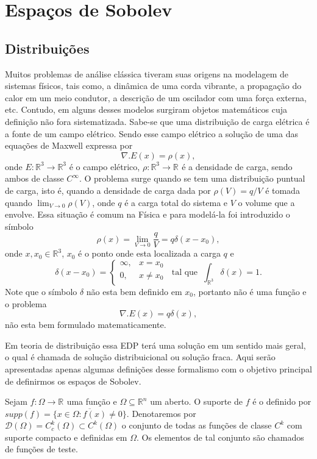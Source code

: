\documentclass[12pt]{book}
\newcommand{\funcaocond}[5]{
	#1 = 
	\left\{
	\begin{array}{cc}
		#2, & #3\\
		#4, & #5\\
	\end{array}
	\right.
}
\newcommand{\funcoesdiferenciaveis}[2]{C^{#1}(#2)}
\newcommand{\funcoesdiferenciaveissupp}[2]{C^{#1}_{c}(#2)}
\newcommand{\funcoesteste}{\mathcal{D}(\Omega)}
\newcommand{\real}[1]{\mathbb{R}^{#1}}
\newcommand{\reta}{\real{}}
\begin{document}
	
	\chapter{Espaços de Sobolev}
	\section{Distribuições}\label{secao_distribuicoes}
	Muitos problemas de análise clássica tiveram suas origens na modelagem de sistemas físicos, tais como, a dinâmica de uma corda vibrante, a propagação do calor em um meio condutor, a descrição de um oscilador com uma força externa, etc. Contudo, em alguns desses modelos surgiram objetos matemáticos cuja definição não fora sistematizada. Sabe-se que uma distribuição de carga elétrica é a fonte de um campo elétrico. Sendo esse campo elétrico a solução de uma das equações de Maxwell expressa por
	$$
	\nabla.E(x) = \rho(x),
	$$
	onde $E:\real{3} \to \real{3}$ é o campo elétrico, $\rho:\real{3}\to \reta$ é a densidade de carga, sendo ambos de classe $C^{\infty}$. O problema surge quando se tem uma distribuição puntual de carga, isto é, quando a densidade de carga dada por $\rho(V) = q/V$ é tomada quando $\lim_{V \to 0}\rho(V)$, onde $q$ é a carga total do sistema e $V$ o volume que a envolve. Essa situação é comum na Física e para modelá-la foi introduzido o símbolo
	$$
	\rho(x) = \lim_{V\to 0} \frac{q}{V} = q\delta(x - x_{0}),
	$$
	onde $x,x_{0} \in \real{3}$, $x_{0}$ é o ponto onde esta localizada a carga $q$ e 
	$$
	\funcaocond{\delta(x - x_{0})}{\infty}{x=x_{0}}{0}{x\neq x_{0}}\;\; \text{tal que} \;\; \int_{\real{3}} \delta(x) = 1.
	$$
	Note que o símbolo $\delta$ não esta bem definido em $x_{0}$, portanto não é uma função e o problema 
	$$
	\nabla.E(x) = q\delta(x),
	$$
	não esta bem formulado matematicamente. 
	
	Em teoria de distribuição essa EDP terá uma solução em um sentido mais geral, o qual é chamada de solução distribuicional ou solução fraca. Aqui serão apresentadas apenas algumas definições desse formalismo com o objetivo principal de definirmos os espaços de Sobolev.
	
	Sejam $f:\Omega\to \reta$ uma função e $\Omega \subseteq \real{n}$ um aberto. O suporte de $f$ é o definido por $supp(f) = \overline{\{ x\in \Omega: f(x)\neq 0 \}}$. Denotaremos por $\funcoesteste=\funcoesdiferenciaveissupp{k}{\Omega} \subset \funcoesdiferenciaveis{k}{\Omega}$ o conjunto de todas as funções de classe $C^{k}$ com suporte compacto e definidas em $\Omega$. Os elementos de tal conjunto são chamados de funções de teste.
	
\end{document}
